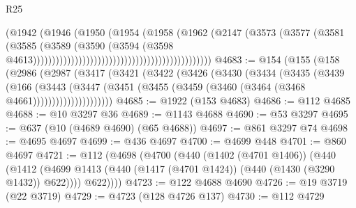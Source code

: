 \begin{lexlean}{R25}
\begin{coremodule}
{{{{{{{{{{{{{{{{{{{{{{{{{{{{{{{{{{{{{{{{{{{{{{{{{{{{{{{{{{{{{{{{{{{{{{{{{{{{{{{{{{{{{{{{{{{{{{{{{{{{{{{{{{{{{{{{{{{{{{{{{{{{{{{{{{{{{{{{{{{{{{{{{{{{{{{{{{{{{{{{{{{{{{{{{{{{{{{{{{{{{{{{{{{{{{{{{{{{{{{                                                                    (@1942
                                                                      (@1946
                                                                        (@1950
                                                                          (@1954
                                                                            (@1958
                                                                              (@1962
                                                                                (@2147
                                                                                  (@3573
                                                                                    (@3577
                                                                                      (@3581
                                                                                        (@3585
                                                                                          (@3589
                                                                                            (@3590
                                                                                              (@3594
                                                                                                (@3598
                                                                                                  @4613)))))))))))))))))))))))))))))))))))))))))))))))
@4683 := @154
    (@155
      (@158
        (@2986
          (@2987
            (@3417
              (@3421
                (@3422
                  (@3426
                    (@3430
                      (@3434
                        (@3435
                          (@3439
                            (@166
                              (@3443
                                (@3447
                                  (@3451
                                    (@3455 (@3459 (@3460 (@3464 (@3468 @4661)))))))))))))))))))))
@4685 := @1922 (@153 @4683)
@4686 := @112 @4685
@4688 := @10 @3297 @36
@4689 := @1143 @4688
@4690 := @53 @3297
@4695 := @637 (@10 (@4689 @4690) (@65 @4688))
@4697 := @861 @3297 @74
@4698 := @4695 @4697
@4699 := @436 @4697
@4700 := @4699 @448
@4701 := @860 @4697
@4721 := @112
    (@4698
      (@4700
        (@440
          (@1402 (@4701 @1406))
          (@440
            (@1412 (@4699 @1413 (@440 (@1417 (@4701 @1424)) (@440 (@1430 (@3290 @1432)) @622))))
            @622))))
@4723 := @122 @4688 @4690
@4726 := @19 @3719 (@22 @3719)
@4729 := @4723 (@128 @4726 @137)
@4730 := @112 @4729
}}}}}}}}}}}}}}}}}}}}}}}}}}}}}}}}}}}}}}}}}}}}}}}}}}}}}}}}}}}}}}}}}}}}}}}}}}}}}}}}}}}}}}}}}}}}}}}}}}}}}}}}}}}}}}}}}}}}}}}}}}}}}}}}}}}}}}}}}}}}}}}}}}}}}}}}}}}}}}}}}}}}}}}}}}}}}}}}}}}}}}}}}}}}}}}}}}}}}}}
\end{coremodule}
\end{lexlean}
